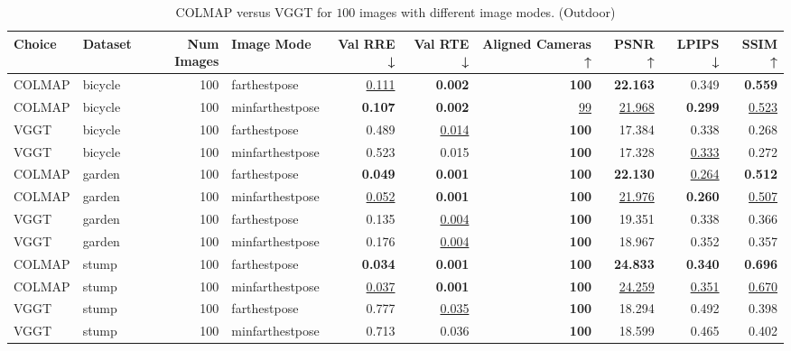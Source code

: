 \begin{table}[H]
\caption{\ifdefined\customcaption \customcaption \else COLMAP versus VGGT for $100$ images with different image modes. (Outdoor) \fi}
\label{tab:01_image_mode_dense_outdoor}
\centering
\scriptsize
\begin{tabular}{llrlrrrrrr}
\toprule
Choice & Dataset & Num Images & Image Mode & Val RRE ↓ & Val RTE ↓ & Aligned Cameras ↑ & PSNR ↑ & LPIPS ↓ & SSIM ↑ \\
\midrule
COLMAP & bicycle & 100 & farthestpose & \underline{0.111} & \textbf{0.002} & \textbf{100} & \textbf{22.163} & 0.349 & \textbf{0.559} \\
COLMAP & bicycle & 100 & minfarthestpose & \textbf{0.107} & \textbf{0.002} & \underline{99} & \underline{21.968} & \textbf{0.299} & \underline{0.523} \\
VGGT & bicycle & 100 & farthestpose & 0.489 & \underline{0.014} & \textbf{100} & 17.384 & 0.338 & 0.268 \\
VGGT & bicycle & 100 & minfarthestpose & 0.523 & 0.015 & \textbf{100} & 17.328 & \underline{0.333} & 0.272 \\
\midrule
COLMAP & garden & 100 & farthestpose & \textbf{0.049} & \textbf{0.001} & \textbf{100} & \textbf{22.130} & \underline{0.264} & \textbf{0.512} \\
COLMAP & garden & 100 & minfarthestpose & \underline{0.052} & \textbf{0.001} & \textbf{100} & \underline{21.976} & \textbf{0.260} & \underline{0.507} \\
VGGT & garden & 100 & farthestpose & 0.135 & \underline{0.004} & \textbf{100} & 19.351 & 0.338 & 0.366 \\
VGGT & garden & 100 & minfarthestpose & 0.176 & \underline{0.004} & \textbf{100} & 18.967 & 0.352 & 0.357 \\
\midrule
COLMAP & stump & 100 & farthestpose & \textbf{0.034} & \textbf{0.001} & \textbf{100} & \textbf{24.833} & \textbf{0.340} & \textbf{0.696} \\
COLMAP & stump & 100 & minfarthestpose & \underline{0.037} & \textbf{0.001} & \textbf{100} & \underline{24.259} & \underline{0.351} & \underline{0.670} \\
VGGT & stump & 100 & farthestpose & 0.777 & \underline{0.035} & \textbf{100} & 18.294 & 0.492 & 0.398 \\
VGGT & stump & 100 & minfarthestpose & 0.713 & 0.036 & \textbf{100} & 18.599 & 0.465 & 0.402 \\
\bottomrule
\end{tabular}
\end{table}